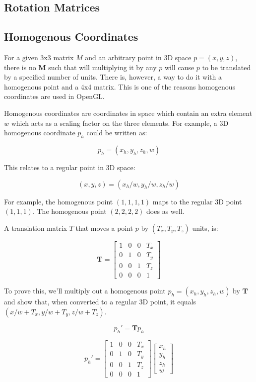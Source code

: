 \subsection{Rotation Matrices}

\subsection{Homogenous Coordinates}
For a given 3x3 matrix $M$ and an arbitrary point in 3D space $p = (x, y, z)$, there is no $\mathbf{M}$ such that will multiplying it by any $p$ will cause $p$ to be translated by a specified number of units. There is, however, a way to do it with a homogenous point and a 4x4 matrix. This is one of the reasons homogenous coordinates are used in OpenGL.

Homogenous coordinates are coordinates in space which contain an extra element $w$ which acts as a scaling factor on the three elements. For example, a 3D homogenous coordinate $p_h$ could be written as:

\[ p_h = (x_h, y_h, z_h, w) \]

This relates to a regular point in 3D space:

\[ (x, y, z) = (x_h / w, y_h / w, z_h / w) \] 

For example, the homogenous point $(1, 1, 1, 1)$ maps to the regular 3D point $(1, 1, 1)$. The homogenous point $(2, 2, 2, 2)$ does as well.

A translation matrix $T$ that moves a point $p$  by $(T_x, T_y, T_z)$ units, is:

\[
\mathbf{T} = \begin{bmatrix}
1 & 0 & 0 & T_x \\
0 & 1 & 0 & T_y \\
0 & 0 & 1 & T_z \\
0 & 0 & 0 & 1
\end{bmatrix}
\]

To prove this, we'll multiply out a homogenous point $p_h = (x_h, y_h, z_h, w)$ by $\mathbf{T}$ and show that, when converted to a regular 3D point, it equals $(x/w + T_x, y/w + T_y, z/w + T_z)$.

\[ p_{h}\prime = \mathbf{T} p_h \]

\[
  p_{h}\prime = \begin{bmatrix}
1 & 0 & 0 & T_x \\
0 & 1 & 0 & T_y \\
0 & 0 & 1 & T_z \\
0 & 0 & 0 & 1
\end{bmatrix} 
\begin{bmatrix}
x_h \\ y_h \\ z_h \\ w 
\end{bmatrix}
\]

